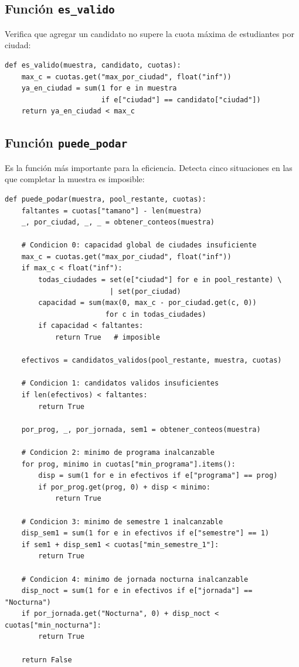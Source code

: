 \documentclass[12pt, a4paper]{article}
\begin{document}
\subsection{Función \texttt{es\_valido}}

Verifica que agregar un candidato no supere la cuota máxima de estudiantes por ciudad:

\begin{lstlisting}[style=python, caption={Restricción de validez (cuota máxima)}]
def es_valido(muestra, candidato, cuotas):
    max_c = cuotas.get("max_por_ciudad", float("inf"))
    ya_en_ciudad = sum(1 for e in muestra
                       if e["ciudad"] == candidato["ciudad"])
    return ya_en_ciudad < max_c
\end{lstlisting}

\subsection{Función \texttt{puede\_podar}}

Es la función más importante para la eficiencia. Detecta cinco situaciones en las que completar la muestra es imposible:

\begin{lstlisting}[style=python, caption={Poda anticipada con cinco condiciones}]
def puede_podar(muestra, pool_restante, cuotas):
    faltantes = cuotas["tamano"] - len(muestra)
    _, por_ciudad, _, _ = obtener_conteos(muestra)

    # Condicion 0: capacidad global de ciudades insuficiente
    max_c = cuotas.get("max_por_ciudad", float("inf"))
    if max_c < float("inf"):
        todas_ciudades = set(e["ciudad"] for e in pool_restante) \
                         | set(por_ciudad)
        capacidad = sum(max(0, max_c - por_ciudad.get(c, 0))
                        for c in todas_ciudades)
        if capacidad < faltantes:
            return True   # imposible

    efectivos = candidatos_validos(pool_restante, muestra, cuotas)

    # Condicion 1: candidatos validos insuficientes
    if len(efectivos) < faltantes:
        return True

    por_prog, _, por_jornada, sem1 = obtener_conteos(muestra)

    # Condicion 2: minimo de programa inalcanzable
    for prog, minimo in cuotas["min_programa"].items():
        disp = sum(1 for e in efectivos if e["programa"] == prog)
        if por_prog.get(prog, 0) + disp < minimo:
            return True

    # Condicion 3: minimo de semestre 1 inalcanzable
    disp_sem1 = sum(1 for e in efectivos if e["semestre"] == 1)
    if sem1 + disp_sem1 < cuotas["min_semestre_1"]:
        return True

    # Condicion 4: minimo de jornada nocturna inalcanzable
    disp_noct = sum(1 for e in efectivos if e["jornada"] == "Nocturna")
    if por_jornada.get("Nocturna", 0) + disp_noct < cuotas["min_nocturna"]:
        return True

    return False
\end{lstlisting}
\end{document}
